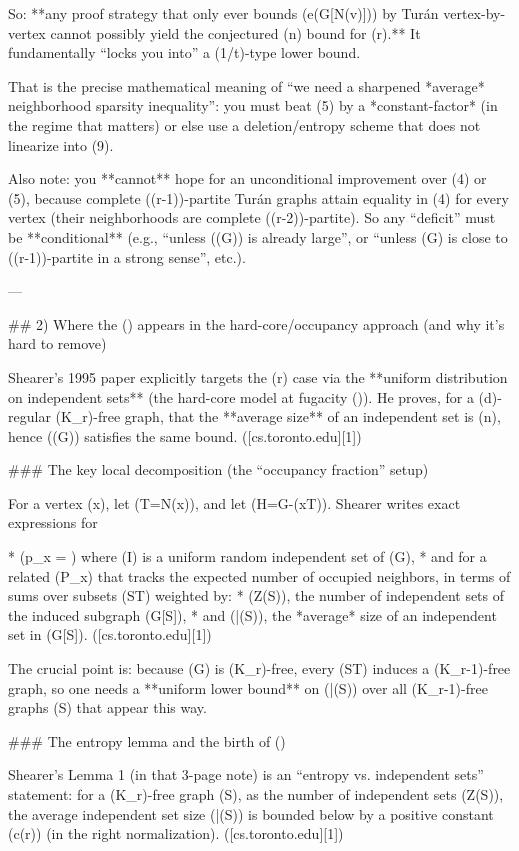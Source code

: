 So: **any proof strategy that only ever bounds (e(G[N(v)])) by Turán vertex-by-vertex cannot possibly yield the conjectured (n) bound for (r).**
It fundamentally “locks you into” a (1/t)-type lower bound.

That is the precise mathematical meaning of “we need a sharpened *average* neighborhood sparsity inequality”: you must beat (5) by a *constant-factor* (in the regime that matters) or else use a deletion/entropy scheme that does not linearize into (9).

Also note: you **cannot** hope for an unconditional improvement over (4) or (5), because complete ((r-1))-partite Turán graphs attain equality in (4) for every vertex (their neighborhoods are complete ((r-2))-partite). So any “deficit” must be **conditional** (e.g., “unless (\alpha(G)) is already large”, or “unless (G) is close to ((r-1))-partite in a strong sense”, etc.).

---

## 2) Where the (\log\log) appears in the hard-core/occupancy approach (and why it’s hard to remove)

Shearer’s 1995 paper explicitly targets the (r) case via the **uniform distribution on independent sets** (the hard-core model at fugacity ()). He proves, for a (d)-regular (K_r)-free graph, that the **average size** of an independent set is (\gtrsim n), hence (\alpha(G)) satisfies the same bound. ([cs.toronto.edu][1])

### The key local decomposition (the “occupancy fraction” setup)

For a vertex (x), let (T=N(x)), and let (H=G-({x}\cup T)). Shearer writes exact expressions for

* (p_x = \Pr[x\in I]) where (I) is a uniform random independent set of (G),
* and for a related (P_x) that tracks the expected number of occupied neighbors,
  in terms of sums over subsets (S\subseteq T) weighted by:
* (Z(S)), the number of independent sets of the induced subgraph (G[S]),
* and (\bar\alpha(S)), the *average* size of an independent set in (G[S]). ([cs.toronto.edu][1])

The crucial point is: because (G) is (K_r)-free, every (S\subseteq T) induces a (K_{r-1})-free graph, so one needs a **uniform lower bound** on (\bar\alpha(S)) over all (K_{r-1})-free graphs (S) that appear this way.

### The entropy lemma and the birth of (\log\log)

Shearer’s Lemma 1 (in that 3-page note) is an “entropy vs. independent sets” statement: for a (K_r)-free graph (S), as the number of independent sets (Z(S)\to\infty), the average independent set size (\bar\alpha(S)) is bounded below by a positive constant (c(r)) (in the right normalization). ([cs.toronto.edu][1])

